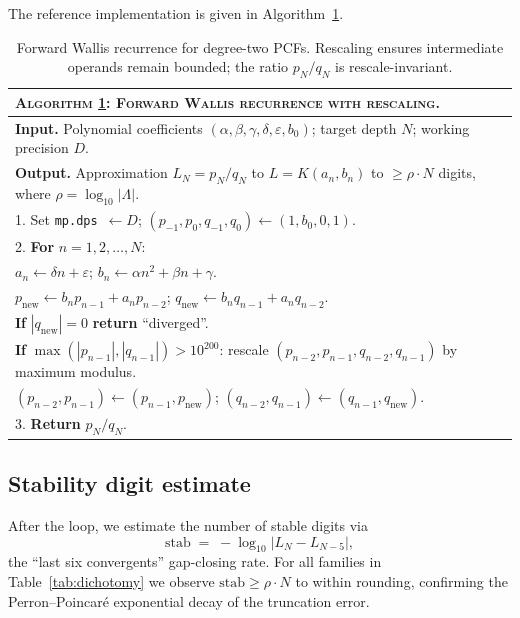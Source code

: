 \documentclass[11pt,reqno]{amsart}
\theoremstyle{definition}
\begin{document}
The reference implementation is given in
Algorithm~\ref{alg:wallis}.

\begin{table}[h]
\centering
\begin{tabular}{p{}}
\toprule
\textsc{Algorithm \ref{alg:wallis}: Forward Wallis recurrence with rescaling.}\\
\midrule
\textbf{Input.} Polynomial coefficients
$(\alpha,\beta,\gamma,\delta,\varepsilon,b_{0})$;
target depth $N$; working precision $D$.\\[2pt]
\textbf{Output.} Approximation
$L_{N}=p_{N}/q_{N}$ to $L=K(a_{n},b_{n})$ to
$\ge \rho\cdot N$ digits, where
$\rho=\log_{10}|\Lambda|$.\\[2pt]
1. Set \texttt{mp.dps}~$\leftarrow D$;
$(p_{-1},p_{0},q_{-1},q_{0})\leftarrow(1,b_{0},0,1)$.\\
2. \textbf{For} $n=1,2,\ldots,N$:\\
\quad\quad $a_{n}\leftarrow \delta n+\varepsilon$;
$b_{n}\leftarrow \alpha n^{2}+\beta n+\gamma$.\\
\quad\quad $p_{\mathrm{new}}\leftarrow b_{n}p_{n-1}+a_{n}p_{n-2}$;
$q_{\mathrm{new}}\leftarrow b_{n}q_{n-1}+a_{n}q_{n-2}$.\\
\quad\quad \textbf{If} $|q_{\mathrm{new}}|=0$ \textbf{return} ``diverged''.\\
\quad\quad \textbf{If} $\max(|p_{n-1}|,|q_{n-1}|)>10^{200}$:
rescale $(p_{n-2},p_{n-1},q_{n-2},q_{n-1})$ by maximum
modulus.\\
\quad\quad $(p_{n-2},p_{n-1})\leftarrow(p_{n-1},p_{\mathrm{new}})$;
$(q_{n-2},q_{n-1})\leftarrow(q_{n-1},q_{\mathrm{new}})$.\\
3. \textbf{Return} $p_{N}/q_{N}$.\\
\bottomrule
\end{tabular}
\caption{Forward Wallis recurrence for degree-two PCFs.
Rescaling ensures intermediate operands remain bounded; the
ratio $p_{N}/q_{N}$ is rescale-invariant.}
\label{alg:wallis}
\end{table}

\subsection{Stability digit estimate}\label{app:stab}

After the loop, we estimate the number of stable digits via
\[
\mathrm{stab} \;=\; -\log_{10}|L_{N}-L_{N-5}|,
\]
the ``last six convergents'' gap-closing rate. For all
families in Table~\ref{tab:dichotomy} we observe
$\mathrm{stab}\ge \rho\cdot N$ to within rounding, confirming
the Perron--Poincar\'e exponential decay of the truncation
error.
\end{document}
